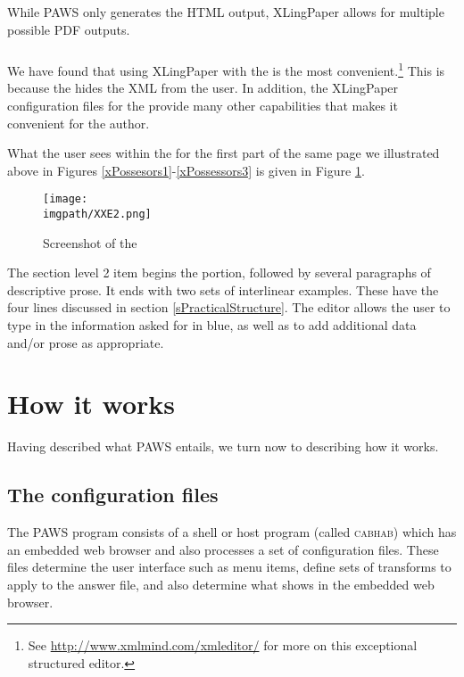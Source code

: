 While {PAWS} only generates the HTML output, XLingPaper allows for multiple possible PDF outputs.

\subsubsection{{\XMLmindXMLEditor}}\label{sXMLMind}
We have found that using XLingPaper with the {\XMLmindXMLEditor} is the most convenient.\footnote{\label{nXXE}
   See \url{http://www.xmlmind.com/xmleditor/} for more on this exceptional structured editor.
} 
This is because the {\XMLmindXMLEditor} hides the XML from the user. In addition, the XLingPaper configuration files for the {\XMLmindXMLEditor} provide many other capabilities that makes it convenient for the author.

What the user sees within the {\XMLmindXMLEditor} for the first part of the same page we illustrated above in Figures \ref{xPossesors1}-\ref{xPossessors3} is given in Figure \ref{xXXE1}.

\clearpage
\begin{figure}[h]
\texttt{[image: \\imgpath/XXE2.png]}
\caption{Screenshot of the {\XMLmindXMLEditor}}
\label{xXXE1}%
\end{figure}
\clearpage
The section level 2 item begins the portion, followed by several paragraphs of descriptive prose. It ends with two sets of interlinear examples. These have the four lines discussed in section \ref{sPracticalStructure}. The editor allows the user to type in the information asked for in blue, as well as to add additional data and/or prose as appropriate.

\section{How it works}\label{sComp}
Having described what {PAWS} entails, we turn now to describing how it works. 


\subsection{The configuration files}\label{sConfig}
The {PAWS} program consists of a shell or host program (called \textsc{cabhab}) which has an embedded web browser and also processes a set of configuration files. These files determine the user interface such as menu items, define sets of transforms to apply to the answer file, and also determine what shows in the embedded web browser.

